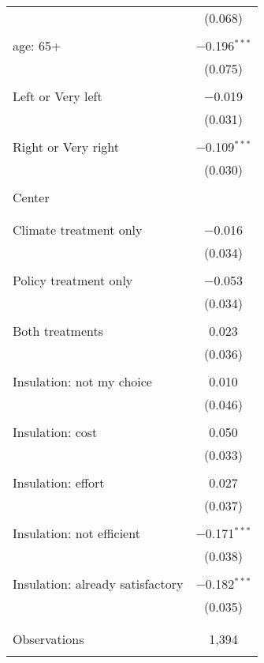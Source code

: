 \begin{tabular}{@{\extracolsep{5pt}}lc}
  & (0.068) \\ 
  & \\ 
 age: 65+ & $-$0.196$^{***}$ \\ 
  & (0.075) \\ 
  & \\ 
 Left or Very left & $-$0.019 \\ 
  & (0.031) \\ 
  & \\ 
 Right or Very right & $-$0.109$^{***}$ \\ 
  & (0.030) \\ 
  & \\ 
 Center &  \\ 
  &  \\ 
  & \\ 
 Climate treatment only & $-$0.016 \\ 
  & (0.034) \\ 
  & \\ 
 Policy treatment only & $-$0.053 \\ 
  & (0.034) \\ 
  & \\ 
 Both treatments & 0.023 \\ 
  & (0.036) \\ 
  & \\ 
 Insulation: not my choice & 0.010 \\ 
  & (0.046) \\ 
  & \\ 
 Insulation: cost & 0.050 \\ 
  & (0.033) \\ 
  & \\ 
 Insulation: effort & 0.027 \\ 
  & (0.037) \\ 
  & \\ 
 Insulation: not efficient & $-$0.171$^{***}$ \\ 
  & (0.038) \\ 
  & \\ 
 Insulation: already satisfactory & $-$0.182$^{***}$ \\ 
  & (0.035) \\ 
  & \\ 
\hline \\[-1.8ex] 

Observations & 1,394 \\ 
\hline 
\hline \\[-1.8ex] 
\end{tabular} 